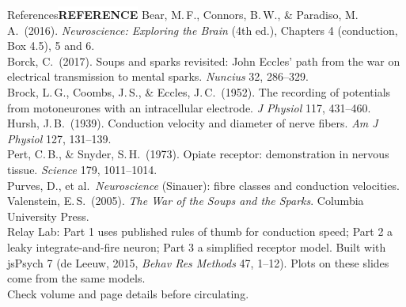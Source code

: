 \documentclass[aspectratio=169,11pt]{beamer}
\newcommand{\tagpill}[3]{{\normalfont\footnotesize\setlength{\fboxsep}{2.5pt}\colorbox{#1}{\textcolor{#2}{\bfseries #3}}}}
\newcommand{\tRef}{\tagpill{white}{kgrey}{REFERENCE}}
\begin{document}
\begin{frame}{References}{\tRef}
  \fontsize{7.5}{8.8}\selectfont
  Bear, M.\,F., Connors, B.\,W., \& Paradiso, M.\,A.\ (2016). \emph{Neuroscience: Exploring the Brain} (4th ed.), Chapters 4 (conduction, Box 4.5), 5 and 6.\\[2pt]
  Borck, C.\ (2017). Soups and sparks revisited: John Eccles' path from the war on electrical transmission to mental sparks. \emph{Nuncius} 32, 286--329.\\[2pt]
  Brock, L.\,G., Coombs, J.\,S., \& Eccles, J.\,C.\ (1952). The recording of potentials from motoneurones with an intracellular electrode. \emph{J Physiol} 117, 431--460.\\[2pt]
  Hursh, J.\,B.\ (1939). Conduction velocity and diameter of nerve fibers. \emph{Am J Physiol} 127, 131--139.\\[2pt]
  Pert, C.\,B., \& Snyder, S.\,H.\ (1973). Opiate receptor: demonstration in nervous tissue. \emph{Science} 179, 1011--1014.\\[2pt]
  Purves, D., et al.\ \emph{Neuroscience} (Sinauer): fibre classes and conduction velocities.\\[2pt]
  Valenstein, E.\,S.\ (2005). \emph{The War of the Soups and the Sparks}. Columbia University Press.\\[4pt]
  Relay Lab: Part 1 uses published rules of thumb for conduction speed; Part 2 a leaky integrate-and-fire neuron; Part 3 a simplified receptor model. Built with jsPsych 7 (de Leeuw, 2015, \emph{Behav Res Methods} 47, 1--12). Plots on these slides come from the same models.\\[3pt]
  {\color{kred}Check volume and page details before circulating.}
\end{frame}
\end{document}
